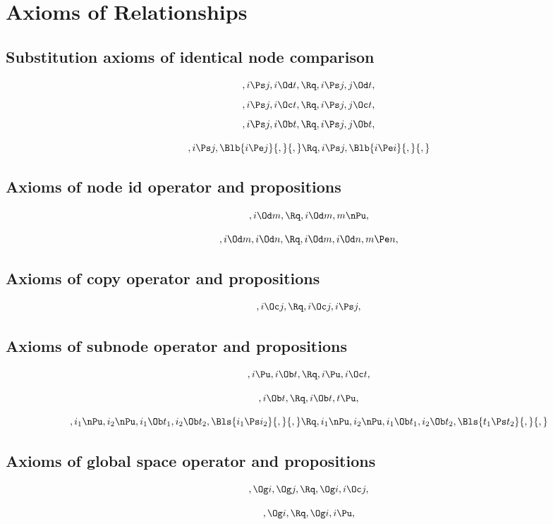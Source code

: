 \section{Axioms of Relationships}

\subsection{Substitution axioms of identical node comparison}

\[,i \Ps j, i \Od t, \Rq , i \Ps j, j \Od t,\]
\[,i \Ps j, i \Oc t, \Rq , i \Ps j, j \Oc t,\]
\[,i \Ps j, i \Ob t, \Rq , i \Ps j, j \Ob t,\]
\bigskip
\bigskip

\[,i \Ps j, \Blb{i \Pe j}{,}{,} \Rq , i \Ps j, \Blb{i \Pe i}{,}{,}\]



\bigskip
\bigskip
\bigskip
\bigskip
\subsection{ Axioms of node id operator and propositions}
\[, i \Od m, \Rq , i \Od m, m \nPu,\]

\[, i \Od m, i \Od n, \Rq , i \Od m, i \Od n, m \Pe n,\]

\bigskip
\bigskip
\bigskip
\bigskip
\subsection{ Axioms of copy operator and propositions}
\[, i \Oc j , \Rq , i \Oc j , i \Ps j,\]

\bigskip
\bigskip
\bigskip
\bigskip
\subsection{ Axioms of subnode operator and propositions}
\[,i \Pu, i \Ob t, \Rq , i \Pu, i \Oc t,\]

\[, i \Ob t, \Rq ,i \Ob t, t \Pu,\]

\[,i_1 \nPu, i_2 \nPu, i_1 \Ob t_1, i_2 \Ob t_2, \Bls{i_1 \Ps i_2}{,}{,} \Rq ,i_1 \nPu, i_2 \nPu, i_1 \Ob t_1, i_2 \Ob t_2, \Bls{t_1 \Ps t_2}{,}{,}\]


\bigskip
\bigskip
\bigskip
\bigskip
\subsection{ Axioms of global space operator and propositions}
\[,\Og i, \Og j, \Rq , \Og i, i \Oc j,\]


\[, \Og i, \Rq , \Og i, i \Pu ,\]


